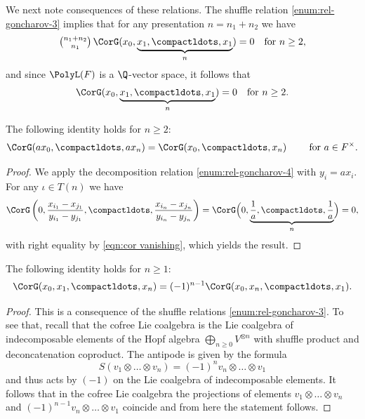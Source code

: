 \documentclass[a4paper]{amsart}
\begin{document}
We next note consequences of these relations. The shuffle relation \eqref{enum:rel-goncharov-3} implies that for any presentation $n=n_1+n_2$ we have
\[
{\textstyle{n_1+n_2 \choose n_1}}\,\CorG(x_0,\underbrace{x_1,\compactldots,x_1}_n)=0 \quad \text{for } n\geq 2,
\]
and since $\PolyL(F)$ is a $\Q$-vector space, it follows that
\begin{equation}\label{eqn:cor vanishing}
\CorG(x_0,\underbrace{x_1,\compactldots,x_1}_n)=0 \quad \text{for } n\geq 2.
\end{equation}

\begin{lemma} \label{lemma: multiplicative homogenity relation for correlators}  The following identity holds for $n \geq 2$:
    \[
    \CorG(ax_0,\compactldots,ax_n)=\CorG(x_0,\compactldots, x_n) \qquad \text{ for $a \in F^{\times}$}.
    \]
\end{lemma}

\begin{proof}
We apply the decomposition relation \eqref{enum:rel-goncharov-4} with $y_i=a x_i$. For any $\iota \in T(n)$ we have
\[
 \CorG\left(0,\frac{x_{i_1}-x_{j_1}}{y_{i_1}-y_{j_1}},\compactldots,\frac{x_{i_n}-x_{j_n}}{y_{i_n}-y_{j_n}}\right)=\CorG\Bigl(0,\underbrace{\frac{1}{a},\compactldots,\frac{1}{a}}_n\Bigr)=0,
\]
with right equality by \eqref{eqn:cor vanishing}, which yields the result.
\end{proof}

\begin{lemma}\label{lemma: reversal relation for correlators}The following identity holds for $n\geq 1$: 
    \[
    \CorG(x_0,x_1,\compactldots,x_n)=(-1)^{n-1}\CorG(x_0,x_n,\compactldots,x_1).
    \]
\end{lemma}

\begin{proof} This is a consequence of the shuffle relations \eqref{enum:rel-goncharov-3}. To see that, recall that the cofree Lie coalgebra is the Lie coalgebra of indecomposable elements of the Hopf algebra $\bigoplus_{n\geq 0} V^{\otimes n}$ with shuffle product and deconcatenation coproduct. The antipode is given by the formula \cite[Example 1.6.3]{GrinbergReiner}
\[
S(v_1\otimes \dots \otimes v_n)=(-1)^n v_n\otimes \dots\otimes v_1
\]
and thus acts by $(-1)$ on the Lie coalgebra of indecomposable elements. It follows that in the cofree Lie coalgebra the projections of elements $v_1\otimes \dots \otimes v_n$ and $(-1)^{n-1} v_n\otimes \dots\otimes v_1$ coincide and from here the statement follows.
\end{proof}
\end{document}
